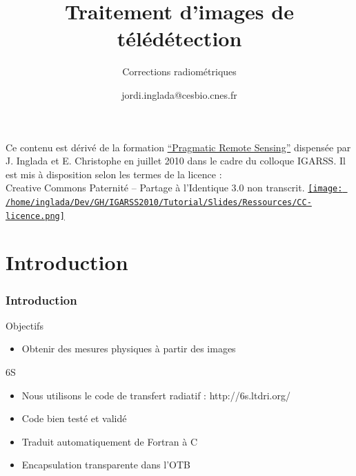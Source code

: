 \documentclass[compress,handout]{beamer}
\title{Traitement d'images de télédétection}
\subtitle{Corrections radiométriques}
\author
{jordi.inglada@cesbio.cnes.fr}
\institute[Cesbio] %
{\textsc{Centre d'Études Spatiales de la Biosphère, Toulouse, France}}
\date{}
\begin{document}
\begin{frame}
  \titlepage
  \begin{center}
{\tiny Ce contenu est dérivé de la formation \href{http://www.orfeo-toolbox.org/packages/PragmaticRemoteSensing-handout.pdf}{``Pragmatic Remote
  Sensing''} dispensée par J. Inglada et E. Christophe en juillet 2010
  dans le cadre du colloque IGARSS. Il est mis à disposition selon les termes de la licence :\\
Creative Commons Paternité – Partage à l’Identique 3.0 non transcrit.} \href{http://creativecommons.org/licenses/by-sa/3.0/}{\texttt{[image: /home/inglada/Dev/GH/IGARSS2010/Tutorial/Slides/Ressources/CC-licence.png]}}    
  \end{center}
\end{frame}

\section*{Introduction}

\begin{frame}

  \frametitle{Introduction}
  \begin{block}{Objectifs}
   \begin{itemize}
   \item Obtenir des mesures physiques à partir des images
   \end{itemize}
  \end{block}
  \begin{block}{6S}
   \begin{itemize}
    \item Nous utilisons le code de transfert radiatif : http://6s.ltdri.org/
    \item Code bien testé et validé
    \item Traduit automatiquement de Fortran à C
    \item Encapsulation transparente dans l'OTB
   \end{itemize}
  \end{block}

\end{frame}
\end{document}
